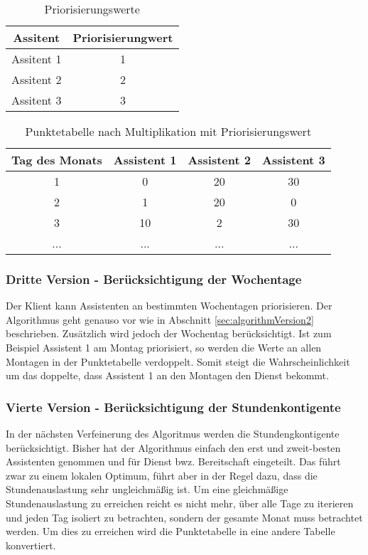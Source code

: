 \documentclass[12pt,a4paper,titlepage]{article} %
\begin{document}
\begin{table}[htb]
\centering
\begin{tabular}{|c|c|}
\hline 
Assitent & Priorisierungwert \\ 
\hline 
Assitent 1 & 1 \\ 
\hline 
Assitent 2 & 2 \\ 
\hline 
Assitent 3 & 3 \\ 
\hline 
\end{tabular} 
\caption{Priorisierungswerte}
\label{tab:teamMemberPriorities}
\end{table}

\begin{table}[htb]
\centering
\begin{tabular}{|c|c|c|c|}
\hline 
Tag des Monats & Assistent 1 & Assistent 2 & Assistent 3 \\ 
\hline 
1 & 0 & 20 & 30 \\ 
\hline 
2 & 1 & 20 & 0 \\ 
\hline 
3 & 10 & 2 & 30 \\ 
\hline 
... & ... & ... & ... \\ 
\hline 
\end{tabular}
\caption{Punktetabelle nach Multiplikation mit Priorisierungswert}
\label{tab:scoreTable2}
\end{table}

\subsubsection{Dritte Version - Berücksichtigung der Wochentage}
\label{sec:algorithmVersion3}
Der Klient kann Assistenten an bestimmten Wochentagen priorisieren. %
Der Algorithmus geht genauso vor wie in Abschnitt \ref{sec:algorithmVersion2} beschrieben. Zusätzlich wird jedoch der Wochentag berücksichtigt. Ist zum Beispiel Assistent 1 am Montag priorisiert, so werden die Werte an allen Montagen in der Punktetabelle verdoppelt. Somit steigt die Wahrscheinlichkeit um das doppelte, dass Assistent 1 an den Montagen den Dienst bekommt.

\subsubsection{Vierte Version - Berücksichtigung der Stundenkontigente}
\label{sec:algorithmVersion4}
In der nächsten Verfeinerung des Algoritmus werden die Stundengkontigente berücksichtigt. Bisher hat der Algorithmus einfach den erst und zweit-besten Assistenten genommen und für Dienst bwz. Bereitschaft eingeteilt. Das führt zwar zu einem lokalen Optimum, führt aber in der Regel dazu, dass die Stundenauslastung sehr ungleichmäßig ist. Um eine gleichmäßige Stundenauslastung zu erreichen reicht es nicht mehr, über alle Tage zu iterieren und jeden Tag isoliert zu betrachten, sondern der gesamte Monat muss betrachtet werden.
Um dies zu erreichen wird die Punktetabelle in eine andere Tabelle konvertiert.
\end{document}
